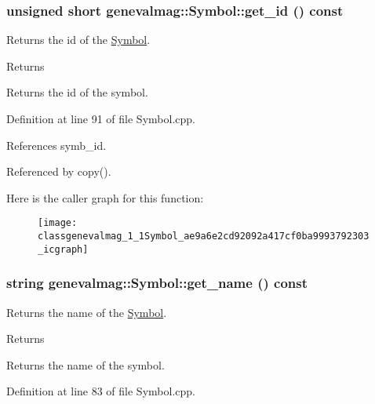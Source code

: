 \hypertarget{classgenevalmag_1_1Symbol_ae9a6e2cd92092a417cf0ba9993792303}{
\subsubsection[{get\_\-id}]{\setlength{\rightskip}{0pt plus 5cm}unsigned short genevalmag::Symbol::get\_\-id () const}}
\label{classgenevalmag_1_1Symbol_ae9a6e2cd92092a417cf0ba9993792303}
Returns the id of the \hyperlink{classgenevalmag_1_1Symbol}{Symbol}. \begin{DoxyReturn}{Returns}

\end{DoxyReturn}
Returns the id of the symbol. 

Definition at line 91 of file Symbol.cpp.



References symb\_\-id.



Referenced by copy().



Here is the caller graph for this function:\nopagebreak
\begin{figure}[H]
\begin{center}
\leavevmode
\texttt{[image: classgenevalmag\_1\_1Symbol\_ae9a6e2cd92092a417cf0ba9993792303\_icgraph]}
\end{center}
\end{figure}


\hypertarget{classgenevalmag_1_1Symbol_afcd9c46fe546ec9f1b62caeb99377917}{
\subsubsection[{get\_\-name}]{\setlength{\rightskip}{0pt plus 5cm}string genevalmag::Symbol::get\_\-name () const}}
\label{classgenevalmag_1_1Symbol_afcd9c46fe546ec9f1b62caeb99377917}
Returns the name of the \hyperlink{classgenevalmag_1_1Symbol}{Symbol}. \begin{DoxyReturn}{Returns}

\end{DoxyReturn}
Returns the name of the symbol. 

Definition at line 83 of file Symbol.cpp.



